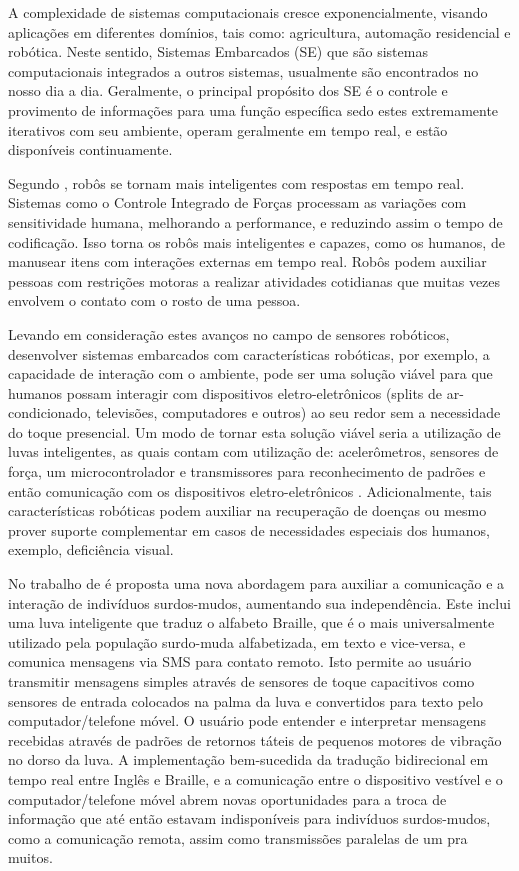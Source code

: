 A complexidade de sistemas computacionais cresce exponencialmente, visando aplicações em diferentes domínios, tais como: agricultura, automação residencial e robótica. Neste sentido, Sistemas Embarcados (SE) que são sistemas computacionais integrados a outros sistemas, usualmente são encontrados no nosso dia a dia. Geralmente, o principal propósito dos SE é o controle e provimento de informações para uma função específica \cite{RAMESH:2012} sedo estes extremamente iterativos com seu ambiente, operam geralmente em tempo real, e estão disponíveis continuamente. 


Segundo \cite{SERGEY:2016}, robôs se tornam mais inteligentes com respostas em tempo real. Sistemas como o Controle Integrado de Forças processam as variações com sensitividade humana, melhorando a performance, e reduzindo assim o tempo de codificação. Isso torna os robôs mais inteligentes e capazes, como os humanos, de manusear itens com interações externas em tempo real. Robôs podem auxiliar pessoas com restrições motoras a realizar atividades cotidianas que muitas vezes envolvem o contato com o rosto de uma pessoa.


Levando em consideração estes avanços no campo de sensores robóticos, desenvolver sistemas embarcados com características robóticas, por exemplo, a capacidade de interação com o ambiente, pode ser uma solução viável para que humanos possam interagir com dispositivos eletro-eletrônicos (splits de ar-condicionado, televisões, computadores e outros) ao seu redor sem a necessidade do toque presencial. Um modo de tornar esta solução viável seria a utilização de luvas inteligentes, as quais contam com utilização de: acelerômetros, sensores de força, um microcontrolador e transmissores \cite{WESTERFELD:2012} para reconhecimento de padrões e então comunicação com os dispositivos eletro-eletrônicos \cite{OFLYNN:2013} \cite{BERNIERI:2015} \cite{CHOUDHARY:2015}. Adicionalmente, tais características robóticas podem auxiliar na recuperação de doenças ou mesmo prover suporte complementar em casos de necessidades especiais dos humanos, exemplo, deficiência visual.


No trabalho de \cite{CHOUDHARY:2015} é proposta uma nova abordagem para auxiliar a comunicação e a interação de indivíduos surdos-mudos, aumentando sua independência. Este inclui uma luva inteligente que traduz o alfabeto Braille, que é o mais universalmente utilizado pela população surdo-muda alfabetizada, em texto e vice-versa, e comunica mensagens via SMS para contato remoto. Isto permite ao usuário transmitir mensagens simples através de sensores de toque capacitivos como sensores de entrada colocados na palma da luva e convertidos para texto pelo computador/telefone móvel. O usuário pode entender e interpretar mensagens recebidas através de padrões de retornos táteis de pequenos motores de vibração no dorso da luva. A implementação bem-sucedida da tradução bidirecional em tempo real entre Inglês e Braille, e a comunicação entre o dispositivo vestível e o computador/telefone móvel abrem novas oportunidades para a troca de informação que até então estavam indisponíveis para indivíduos surdos-mudos, como a comunicação remota, assim como transmissões paralelas de um pra muitos.


